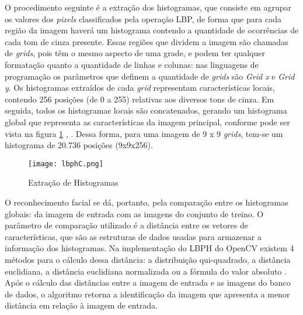 O procedimento seguinte é a extração dos histogramas, que consiste em agrupar os valores dos \textit{pixels }classificados pela operação LBP, de forma que para cada região da imagem haverá um histograma contendo a quantidade de ocorrências de cada tom de cinza presente. Essas regiões que dividem a imagem são chamadas de \textit{grids}, pois têm o mesmo aspecto de uma grade, e podem ter qualquer formatação quanto a quantidade de linhas e colunas: nas linguagens de programação os parâmetros que definem a quantidade de \textit{grids} são \textit{Grid x} e \textit{Grid y}. Os histogramas extraídos de cada \textit{grid} representam características locais, contendo 256 posições (de 0 a 255) relativas aos diversos tons de cinza. Em seguida, todos os histogramas locais são concatenados, gerando um histograma global que representa as características da imagem principal, conforme pode ser vista na figura \ref{fig:figura8} , \citep{Timo2006}. Dessa forma, para uma imagem de 9 x 9 \textit{grids}, tem-se um histograma de 20.736 posições (9x9x256). \newpage

\begin{figure}[!ht]
	\centering
	\texttt{[image: lbphC.png]}   
	\caption{Extração de Histogramas}
	\label{fig:figura8}
\end{figure}

O reconhecimento facial se dá, portanto, pela comparação entre os histogramas globais: da imagem de entrada com as imagens do conjunto de treino. O parâmetro de comparação utilizado é a distância entre os vetores de características, que são as estruturas de dados usadas para armazenar a informação dos histogramas. Na implementação do LBPH do OpenCV existem 4 métodos para o cálculo dessa distância: a distribuição qui-quadrado, a distância euclidiana, a distância euclidiana normalizada ou a fórmula do valor absoluto \citep{open2018}. Após o cálculo das distâncias entre a imagem de entrada e as imagens do banco de dados, o algoritmo retorna a identificação da imagem que apresenta a menor distância em relação à imagem de entrada. %

